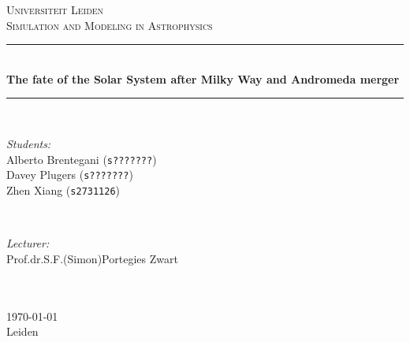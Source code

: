 \documentclass[a4paper,12pt]{article}
\begin{document}
\begin{titlepage}

\newcommand{\HRule}{\rule{\linewidth}{0.5mm}} 

\center 
\begin{figure}[H]  \end{figure}
\textsc{\LARGE Universiteit Leiden}\\[1.5cm] 
\textsc{\Large Simulation and Modeling in Astrophysics}\\[0.5cm]

\HRule \\[0.4cm]
{ \huge \bfseries The fate of the Solar System after Milky Way and Andromeda merger}\\[0.4cm] 
\HRule \\[1.5cm]

\begin{minipage}{0.45\textwidth}
\begin{flushleft} \large
\emph{Students:}\\
\small{Alberto Brentegani} \small{(\texttt{s???????})}\\
\small{Davey Plugers} \small{(\texttt{s???????})} \\
\small{Zhen Xiang} \small{(\texttt{s2731126})}
\end{flushleft}
\end{minipage}
~
\begin{minipage}{0.4\textwidth}
\begin{flushright} \large
\emph{Lecturer:} \\
\small{Prof.dr.S.F.(Simon)Portegies Zwart}\\
\hspace{1cm} \\
\end{flushright}
\end{minipage}\\[4cm]

{\large \today\\Leiden}\\[3cm] 

\end{titlepage}
\end{document}
